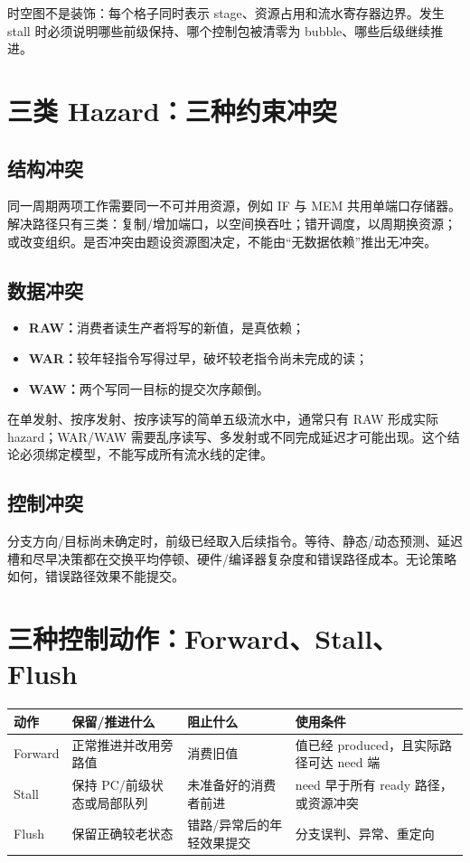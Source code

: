 \documentclass[UTF8,fontset=fandol,11pt,a4paper]{ctexart}
\newcommand{\kw}[1]{\textbf{\color{deep}#1}}
\begin{document}
时空图不是装饰：每个格子同时表示 stage、资源占用和流水寄存器边界。发生 stall 时必须说明哪些前级保持、哪个控制包被清零为 bubble、哪些后级继续推进。

\section{三类 Hazard：三种约束冲突}

\subsection{结构冲突}
同一周期两项工作需要同一不可并用资源，例如 IF 与 MEM 共用单端口存储器。解决路径只有三类：复制/增加端口，以空间换吞吐；错开调度，以周期换资源；或改变组织。是否冲突由题设资源图决定，不能由“无数据依赖”推出无冲突。

\subsection{数据冲突}
\begin{itemize}
  \item \kw{RAW：}消费者读生产者将写的新值，是真依赖；
  \item \kw{WAR：}较年轻指令写得过早，破坏较老指令尚未完成的读；
  \item \kw{WAW：}两个写同一目标的提交次序颠倒。
\end{itemize}

在单发射、按序发射、按序读写的简单五级流水中，通常只有 RAW 形成实际 hazard；WAR/WAW 需要乱序读写、多发射或不同完成延迟才可能出现。这个结论必须绑定模型，不能写成所有流水线的定律。

\subsection{控制冲突}
分支方向/目标尚未确定时，前级已经取入后续指令。等待、静态/动态预测、延迟槽和尽早决策都在交换平均停顿、硬件/编译器复杂度和错误路径成本。无论策略如何，错误路径效果不能提交。

\section{三种控制动作：Forward、Stall、Flush}

\begin{center}
\small
\begin{tabularx}{\linewidth}{L{2.0cm}Y Y Y}
\toprule
动作 & 保留/推进什么 & 阻止什么 & 使用条件\\
\midrule
Forward & 正常推进并改用旁路值 & 消费旧值 & 值已经 produced，且实际路径可达 need 端\\
Stall & 保持 PC/前级状态或局部队列 & 未准备好的消费者前进 & need 早于所有 ready 路径，或资源冲突\\
Flush & 保留正确较老状态 & 错路/异常后的年轻效果提交 & 分支误判、异常、重定向\\
\bottomrule
\end{tabularx}
\end{center}
\end{document}
